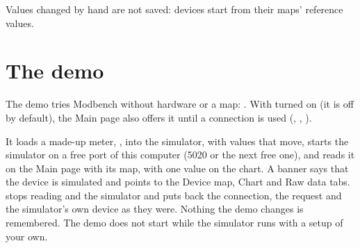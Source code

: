 \begin{note}
Values changed by hand are not saved: devices start from their maps'
reference values.
\end{note}

\section{The demo}
\label{sec:demo}

The demo tries Modbench without hardware or a map: . With  turned on
(it is off by default), the Main page also offers it until a connection is
used (, , ).

It loads a made-up meter, , into the simulator,
with values that move, starts the simulator on a free port of this computer
(5020 or the next free one), and reads it on the Main page with its map, with
one value on the chart. A banner says that the device is simulated and points
to the Device map, Chart and Raw data tabs.  stops reading and
the simulator and puts back the connection, the request and the simulator's own
device as they were. Nothing the demo changes is remembered. The demo does not
start while the simulator runs with a setup of your own.
